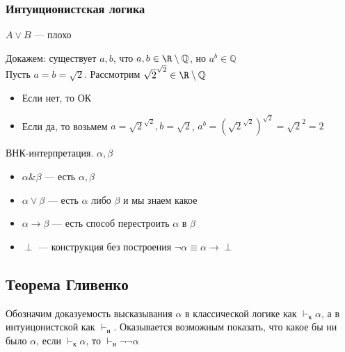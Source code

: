 \documentclass[english]{article}
\begin{document}
\subsubsection{Интуиционистская логика}
\label{sec:org79df238}
\(A \vee B\) --- плохо
\begin{examp}
	Докажем: существует \(a, b\), что \(a, b \in \R \setminus \mathbb{Q}\), но \(a^b \in \mathbb{Q}\) \\
	Пусть \(a = b = \sqrt{2}\). Рассмотрим \(\sqrt{2}^{\sqrt{2}} \in \R \setminus \mathbb{Q}\)
	\begin{itemize}
		\item Если нет, то ОК
		\item Если да, то возьмем \(a = \sqrt{2}^{\sqrt{2}}, b = \sqrt{2}\), \(a^b = (\sqrt{2}^{\sqrt{2}})^{\sqrt{2}} = \sqrt{2}^{2} = 2\)
	\end{itemize}
\end{examp}
\begin{defintion}
	ВНК-интерпретация. \(\alpha, \beta\)
	\begin{itemize}
		\item \(\alpha \& \beta\) --- есть \(\alpha, \beta\)
		\item \(\alpha \vee \beta\) --- есть \(\alpha\) либо \(\beta\) и мы знаем какое
		\item \(\alpha \to \beta\) --- есть способ перестроить \(\alpha\) в \(\beta\)
		\item \(\perp\) --- конструкция без построения \(\neg \alpha \equiv \alpha \to \perp\)
	\end{itemize}
\end{defintion}
\subsection{Теорема Гливенко}
\label{sec:orgdc24986}
\begin{theorem}
	Обозначим доказуемость высказывания \(\alpha\) в классической логике как \(\vdash_{\text{к}} \alpha\), а в интуицонистской как \(\vdash_{\text{и}}\). Оказывается возможным показать, что какое бы ни было \(\alpha\), если \(\vdash_{\text{к}} \alpha\), то \(\vdash_{\text{и}} \neg\neg \alpha\)
\end{theorem}
\end{document}
